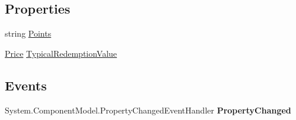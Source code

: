 \subsection*{Properties}
\begin{DoxyCompactItemize}
\item 
\hypertarget{class_price___comparison_1_1amazon_1_1ecs_1_1_loyalty_points_ad319a0bb303e0bd8ded6b37e578ff470}{string \hyperlink{class_price___comparison_1_1amazon_1_1ecs_1_1_loyalty_points_ad319a0bb303e0bd8ded6b37e578ff470}{Points}}\label{class_price___comparison_1_1amazon_1_1ecs_1_1_loyalty_points_ad319a0bb303e0bd8ded6b37e578ff470}

\begin{DoxyCompactList}\small\item\em \end{DoxyCompactList}\item 
\hypertarget{class_price___comparison_1_1amazon_1_1ecs_1_1_loyalty_points_af89dd1656d5f43542d180ee1b3093d5e}{\hyperlink{class_price___comparison_1_1amazon_1_1ecs_1_1_price}{Price} \hyperlink{class_price___comparison_1_1amazon_1_1ecs_1_1_loyalty_points_af89dd1656d5f43542d180ee1b3093d5e}{Typical\-Redemption\-Value}}\label{class_price___comparison_1_1amazon_1_1ecs_1_1_loyalty_points_af89dd1656d5f43542d180ee1b3093d5e}

\begin{DoxyCompactList}\small\item\em \end{DoxyCompactList}\end{DoxyCompactItemize}
\subsection*{Events}
\begin{DoxyCompactItemize}
\item 
\hypertarget{class_price___comparison_1_1amazon_1_1ecs_1_1_loyalty_points_a5cb2e3ee3827d107faa6c4ceb61592a8}{System.\-Component\-Model.\-Property\-Changed\-Event\-Handler {\bfseries Property\-Changed}}\label{class_price___comparison_1_1amazon_1_1ecs_1_1_loyalty_points_a5cb2e3ee3827d107faa6c4ceb61592a8}

\end{DoxyCompactItemize}
